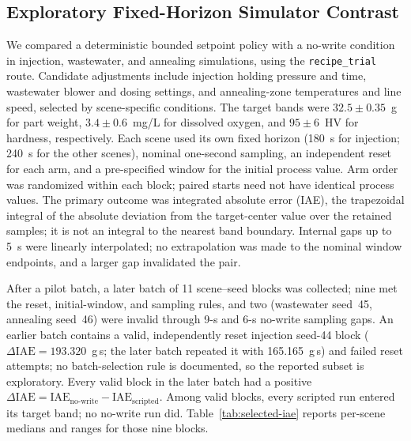\subsection{Exploratory Fixed-Horizon Simulator Contrast}
\label{sec:eval-optimization}
We compared a deterministic bounded setpoint policy with a no-write condition in injection, wastewater, and annealing simulations, using the \texttt{recipe\_trial} route. Candidate adjustments include injection holding pressure and time, wastewater blower and dosing settings, and annealing-zone temperatures and line speed, selected by scene-specific conditions. The target bands were $32.5\pm0.35$~g for part weight, $3.4\pm0.6$~mg/L for dissolved oxygen, and $95\pm6$~HV for hardness, respectively. Each scene used its own fixed horizon (180~s for injection; 240~s for the other scenes), nominal one-second sampling, an independent reset for each arm, and a pre-specified window for the initial process value. Arm order was randomized within each block; paired starts need not have identical process values. The primary outcome was integrated absolute error (IAE), the trapezoidal integral of the absolute deviation from the target-center value over the retained samples; it is not an integral to the nearest band boundary. Internal gaps up to 5~s were linearly interpolated; no extrapolation was made to the nominal window endpoints, and a larger gap invalidated the pair.

After a pilot batch, a later batch of 11 scene--seed blocks was collected; nine met the reset, initial-window, and sampling rules, and two (wastewater seed~45, annealing seed~46) were invalid through 9-s and 6-s no-write sampling gaps. An earlier batch contains a valid, independently reset injection seed-44 block ($\Delta\mathrm{IAE}=193.320$~g\,s; the later batch repeated it with 165.165~g\,s) and failed reset attempts; no batch-selection rule is documented, so the reported subset is exploratory. Every valid block in the later batch had a positive $\Delta\mathrm{IAE}=\mathrm{IAE}_{\mathrm{no\text{-}write}}-\mathrm{IAE}_{\mathrm{scripted}}$. Among valid blocks, every scripted run entered its target band; no no-write run did. Table~\ref{tab:selected-iae} reports per-scene medians and ranges for those nine blocks.


